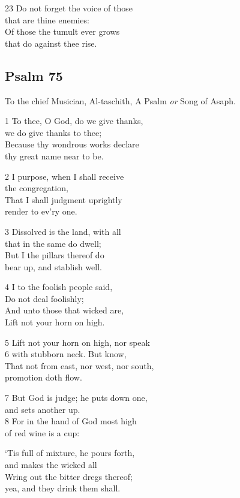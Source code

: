 23 Do not forget the voice of those \\
that are thine enemies:\\
Of those the tumult ever grows\\
that do against thee rise.

\begin{center}
\quad{}\quad{}
\end{center}

\subsection*{Psalm 75}

To the chief Musician, Al-taschith,
A Psalm \emph{or} Song of Asaph.

1 To thee, O God, do we give thanks,\\
we do give thanks to thee;\\
Because thy wondrous works declare\\
thy great name near to be.

2 I purpose, when I shall receive\\
the congregation,\\
That I shall judgment uprightly\\
render to ev’ry one.

3 Dissolved is the land, with all\\
that in the same do dwell;\\
But I the pillars thereof do\\
bear up, and stablish well.

4 I to the foolish people said,\\
Do not deal foolishly;\\
And unto those that wicked are,\\
Lift not your horn on high.

5 Lift not your horn on high, nor speak\\
6 with stubborn neck. But know,\\
That not from east, nor west, nor south,\\
promotion doth flow.

7 But God is judge; he puts down one,\\
and sets another up.\\
8 For in the hand of God most high\\
of red wine is a cup:

‘Tis full of mixture, he pours forth,\\
and makes the wicked all\\
Wring out the bitter dregs thereof;\\
yea, and they drink them shall.

